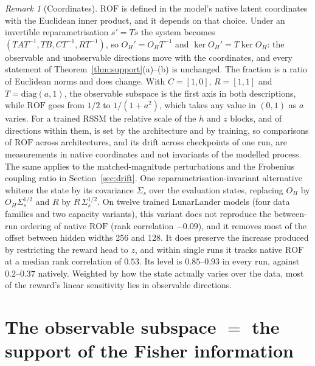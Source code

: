 \documentclass[11pt]{article}
\theoremstyle{remark}
\newtheorem{remark}{Remark}
\newcommand{\ROF}{\mathrm{ROF}}
\begin{document}
\begin{remark}[Coordinates]\label{rem:coords}
$\ROF$ is defined in the model's native latent coordinates with the Euclidean inner product, and it depends on that choice. Under an invertible reparametrisation $s' = T s$ the system becomes $(TAT^{-1}, TB, CT^{-1}, RT^{-1})$, so $O_H' = O_H T^{-1}$ and $\ker O_H' = T \ker O_H$: the observable and unobservable directions move with the coordinates, and every statement of Theorem~\ref{thm:support}(a)--(b) is unchanged. The fraction is a ratio of Euclidean norms and does change. With $C = [1, 0]$, $R = [1, 1]$ and $T = \mathrm{diag}(a, 1)$, the observable subspace is the first axis in both descriptions, while $\ROF$ goes from $1/2$ to $1/(1+a^2)$, which takes any value in $(0,1)$ as $a$ varies. For a trained RSSM the relative scale of the $h$ and $z$ blocks, and of directions within them, is set by the architecture and by training, so comparisons of $\ROF$ across architectures, and its drift across checkpoints of one run, are measurements in native coordinates and not invariants of the modelled process. The same applies to the matched-magnitude perturbations and the Frobenius coupling ratio in Section~\ref{sec:drift}. One reparametrisation-invariant alternative whitens the state by its covariance $\Sigma_s$ over the evaluation states, replacing $O_H$ by $O_H \Sigma_s^{1/2}$ and $R$ by $R\,\Sigma_s^{1/2}$. On twelve trained LunarLander models (four data families and two capacity variants), this variant does not reproduce the between-run ordering of native $\ROF$ (rank correlation $-0.09$), and it removes most of the offset between hidden widths 256 and 128. It does preserve the increase produced by restricting the reward head to $z$, and within single runs it tracks native $\ROF$ at a median rank correlation of $0.53$. Its level is $0.85$--$0.93$ in every run, against $0.2$--$0.37$ natively. Weighted by how the state actually varies over the data, most of the reward's linear sensitivity lies in observable directions.
\end{remark}

\section{The observable subspace $=$ the support of the Fisher information}
\end{document}
